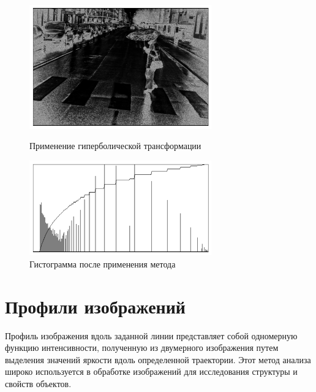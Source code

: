 \documentclass[a4paper,12pt]{article}
\begin{document}
\begin{figure}[H]
    \centering \includegraphics[width=0.7\textwidth]{images/hyp.png}
    \caption{Применение гиперболической трансформации}
    \centering \includegraphics[width=0.7\textwidth]{images/hyp_hist.png}
    \caption{Гистограмма после применения метода}
\end{figure}

\section{Профили изображений}
Профиль изображения вдоль заданной линии представляет собой одномерную функцию интенсивности, полученную из двумерного изображения путем выделения значений яркости вдоль определенной траектории. Этот метод анализа широко используется в обработке изображений для исследования структуры и свойств объектов.
\end{document}
